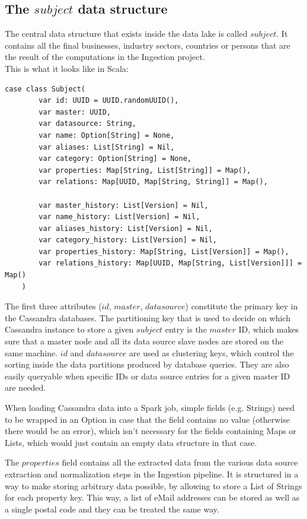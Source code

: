 \documentclass[
        a4paper,     %
        titlepage,   %
        oneside,     %
        parskip      %
]{scrartcl}          %
\begin{document}
    \subsection{The $subject$ data structure}
    \label{sec:subject_structure}
    The central data structure that exists inside the data lake is called $subject$.
    It contains all the final businesses, industry sectors, countries or persons
    that are the result of the computations in the Ingestion project.\\

    This is what it looks like in Scala:
    \begin{lstlisting}[style=scalaStyle,caption=Subject]
    case class Subject(
    	var id: UUID = UUID.randomUUID(),
    	var master: UUID,
    	var datasource: String,
    	var name: Option[String] = None,
    	var aliases: List[String] = Nil,
    	var category: Option[String] = None,
    	var properties: Map[String, List[String]] = Map(),
    	var relations: Map[UUID, Map[String, String]] = Map(),

    	var master_history: List[Version] = Nil,
    	var name_history: List[Version] = Nil,
    	var aliases_history: List[Version] = Nil,
    	var category_history: List[Version] = Nil,
    	var properties_history: Map[String, List[Version]] = Map(),
    	var relations_history: Map[UUID, Map[String, List[Version]]] = Map()
    )
    \end{lstlisting}

    The first three attributes ($id$, $master$, $datasource$) constitute the
    primary key in the Cassandra databases.
    The partitioning key that is used to decide on which Cassandra instance to store
    a given $subject$ entry is the $master$ ID, which makes sure that a master node
    and all its data source slave nodes are stored on the same machine.
    $id$ and $datasource$ are used as clustering keys, which control the sorting
    inside the data partitions produced by database queries. They are also easily
    queryable when specific IDs or data source entries for a given master ID are
    needed.

    When loading Cassandra data into a Spark job, simple fields (e.g. Strings)
    need to be wrapped in an Option in case that the field contains no value
    (otherwise there would be an error), which isn't necessary for the fields
    containing Maps or Lists, which would just contain an empty data structure
    in that case.

    The $properties$ field contains all the extracted data from the various
    data source extraction and normalization steps in the Ingestion pipeline.
    It is structured in a way to make storing arbitrary data possible, by allowing
    to store a List of Strings for each property key. This way, a list of
    eMail addresses can be stored as well as a single postal code and they can
    be treated the same way.
\end{document}
